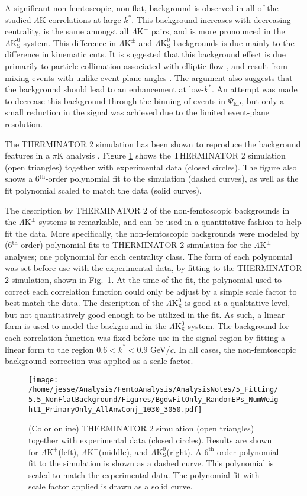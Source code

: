 \documentclass[ALICE,manyauthors]{cernphprep}
\newcommand{\kstar}{$k^{*}$\xspace}
\newcommand{\LamK}{$\Lambda$K\xspace}
\newcommand{\LamKchP}{$\Lambda\mathrm{K^{+}}$\xspace}
\newcommand{\LamKchM}{$\Lambda\mathrm{K^{-}}$\xspace}
\newcommand{\LamKpm}{$\Lambda\mathrm{K^{\pm}}$\xspace}
\newcommand{\LamKs}{$\Lambda\mathrm{K^{0}_{S}}$\xspace}
\begin{document}
A significant non-femtoscopic, non-flat, background is observed in all of the studied \LamK correlations at large \kstar.  
This background increases with decreasing centrality, is the same amongst all \LamKpm pairs, and is more pronounced in the \LamKs system.
This difference in \LamKpm and \LamKs backgrounds is due mainly to the difference in kinematic cuts.  
It is suggested that this background effect is due primarily to particle collimation associated with elliptic flow , and result from mixing events with unlike event-plane angles \cite{Kisiel:2017}.  
The argument also suggests that the background should lead to an enhancement at low-\kstar. 
An attempt was made to decrease this background through the binning of events in $\Psi_{\mathrm{EP}}$, but only a small reduction in the signal was achieved due to the limited event-plane resolution.

The THERMINATOR 2 simulation has been shown to reproduce the background features in a $\pi$K analysis \cite{Kisiel:2017}.  
Figure \ref{fig:BgdswTHERM} shows the THERMINATOR 2 simulation (open triangles) together with experimental data (closed circles).  
The figure also shows a 6$^{\mathrm{th}}$-order polynomial fit to the simulation (dashed curves), as well as the fit polynomial scaled to match the data (solid curves).

The description by THERMINATOR 2 of the non-femtoscopic backgrounds in the \LamKpm systems is remarkable, and can be used in a quantitative fashion to help fit the data.
More specifically, the non-femtoscopic backgrounds were modeled by (6$^{\mathrm{th}}$-order) polynomial fits to THERMINATOR 2 simulation for the \LamKpm analyses; one polynomial for each centrality class.
The form of each polynomial was set before use with the experimental data, by fitting to the THERMINATOR 2 simulation, shown in Fig.\ \ref{fig:BgdswTHERM}.
At the time of the fit, the polynomial used to correct each correlation function could only be adjust by a simple scale factor to best match the data.
The description of the \LamKs is good at a qualitative level, but not quantitatively good enough to be utilized in the fit.
As such, a linear form is used to model the background in the \LamKs system.
The background for each correlation function was fixed before use in the signal region by fitting a linear form to the region $0.6 < k^{*} < 0.9$ GeV/$c$.
In all cases, the non-femtoscopic background correction was applied as a scale factor.

\begin{figure}[h]
  \centering
  \texttt{[image: /home/jesse/Analysis/FemtoAnalysis/AnalysisNotes/5\_Fitting/5.5\_NonFlatBackground/Figures/BgdwFitOnly\_RandomEPs\_NumWeight1\_PrimaryOnly\_AllAnwConj\_1030\_3050.pdf]}
  \caption[Backgrounds with THERMINATOR 2]
  {
  (Color online) THERMINATOR 2 simulation (open triangles) together with experimental data (closed circles).  
  Results are shown for \LamKchP (left), \LamKchM (middle), and \LamKs (right).
  A $6^{\mathrm{th}}$-order polynomial fit to the simulation is shown as a dashed curve.  
  This polynomial is scaled to match the experimental data.  
  The polynomial fit with scale factor applied is drawn as a solid curve.
  }
  \label{fig:BgdswTHERM}
\end{figure} 
\end{document}
